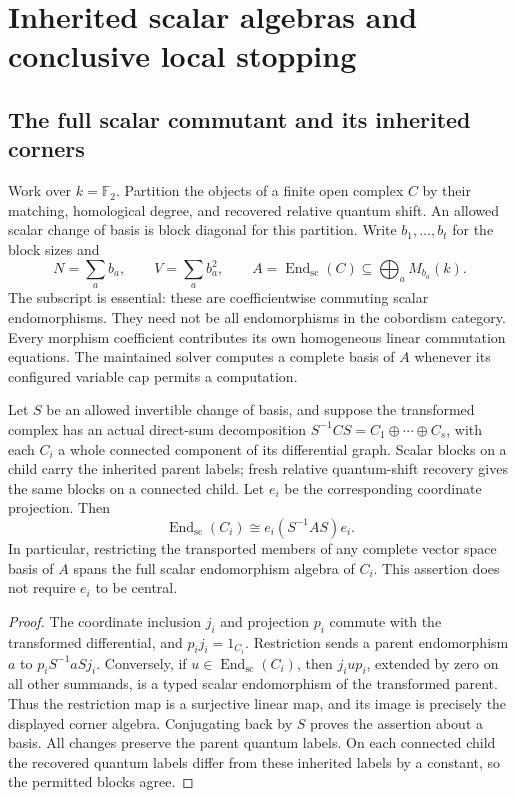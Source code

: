 \section{Inherited scalar algebras and conclusive local stopping}
\label{sec:inheritance}

\subsection{The full scalar commutant and its inherited corners}

Work over $k=\mathbb F_2$. Partition the objects of a finite open complex $C$
by their matching, homological degree, and recovered relative quantum shift.
An allowed scalar change of basis is block diagonal for this partition.
Write $b_1,\ldots,b_t$ for the block sizes and
\[
 N=\sum_a b_a,\qquad V=\sum_a b_a^2,\qquad
 A=\operatorname{End}_{\mathrm{sc}}(C)
   \subseteq\bigoplus_a M_{b_a}(k).
\]
The subscript is essential: these are coefficientwise commuting scalar
endomorphisms. They need not be all endomorphisms in the cobordism category.
Every morphism coefficient contributes its own homogeneous linear
commutation equations. The maintained solver computes a complete basis of
$A$ whenever its configured variable cap permits a computation.

\begin{theorem}
\label{thm:corner}
Let $S$ be an allowed invertible change of basis, and suppose the transformed
complex has an actual direct-sum decomposition
$S^{-1}CS=C_1\oplus\cdots\oplus C_s$, with each $C_i$ a whole connected
component of its differential graph. Scalar blocks on a child carry the
inherited parent labels; fresh relative quantum-shift recovery gives the
same blocks on a connected child. Let $e_i$ be the corresponding
coordinate projection. Then
\[
 \operatorname{End}_{\mathrm{sc}}(C_i)
    \cong e_i(S^{-1}AS)e_i.
\]
In particular, restricting the transported members of any complete vector
space basis of $A$ spans the full scalar endomorphism algebra of $C_i$.
This assertion does not require $e_i$ to be central.
\end{theorem}

\begin{proof}
The coordinate inclusion $j_i$ and projection $p_i$ commute with the
transformed differential, and $p_i j_i=1_{C_i}$. Restriction sends a
parent endomorphism $a$ to $p_iS^{-1}aSj_i$. Conversely, if
$u\in\operatorname{End}_{\mathrm{sc}}(C_i)$, then $j_iup_i$, extended by
zero on all other summands, is a typed scalar endomorphism of the transformed
parent. Thus the restriction map is a surjective linear map, and its image
is precisely the displayed corner algebra. Conjugating back by $S$ proves
the assertion about a basis. All changes preserve the parent quantum
labels. On each connected child the recovered quantum labels differ from
these inherited labels by a constant, so the permitted blocks agree.
\end{proof}

